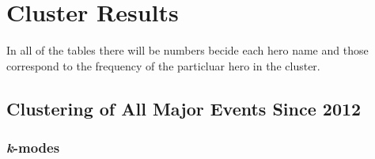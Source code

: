 \documentclass[result.tex]{subfiles}
\begin{document}
\clearpage
\appendix

\section*{Cluster Results}

In all of the tables there will be numbers becide each hero name and those correspond to the frequency of the particluar hero in the cluster.

\subsection*{Clustering of All Major Events Since 2012}

\subsubsection*{\textit{k}-modes}
\end{document}
